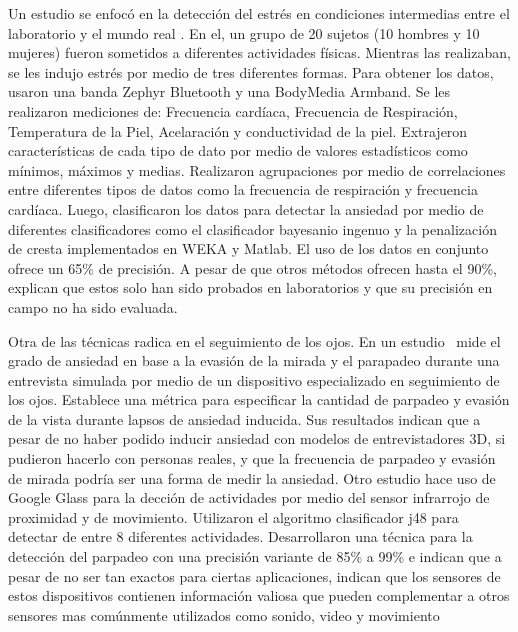 \documentclass[letterpaper,12pt]{cicese}
\begin{document}
				Un estudio se enfoc\'o en la detecci\'on del estr\'es en condiciones intermedias entre el laboratorio y el mundo real \citep{RamosHD14}. En el, un grupo de 20 sujetos (10 hombres y 10 mujeres) fueron sometidos a diferentes actividades f\'isicas. Mientras las realizaban, se les indujo estr\'es por medio de tres diferentes formas. Para obtener los datos, usaron una banda Zephyr Bluetooth y una BodyMedia Armband. Se les realizaron mediciones de: Frecuencia card\'iaca, Frecuencia de Respiraci\'on, Temperatura de la Piel, Acelaraci\'on y conductividad de la piel. Extrajeron caracter\'isticas de cada tipo de dato por medio de valores estad\'isticos como m\'inimos, m\'aximos y medias. Realizaron agrupaciones por medio de correlaciones entre diferentes tipos de datos como la frecuencia de respiraci\'on y frecuencia card\'iaca. Luego, clasificaron los datos para detectar la ansiedad por medio de diferentes clasificadores como el clasificador bayesanio ingenuo y la penalizaci\'on de cresta implementados en WEKA y Matlab. El uso de los datos en conjunto ofrece un 65\% de precisi\'on. A pesar de que otros m\'etodos ofrecen hasta el 90\%, explican que estos solo han sido probados en laboratorios y que su precisi\'on en campo no ha sido evaluada.

				Otra de las t\'ecnicas radica en el seguimiento de los ojos. En un estudio \citep{Kwon2009} mide el grado de ansiedad en base a la evasi\'on de la mirada y el parapadeo durante una entrevista simulada por medio de un dispositivo especializado en seguimiento de los ojos. Establece una m\'etrica para especificar la cantidad de parpadeo y evasi\'on de la vista durante lapsos de ansiedad inducida. Sus resultados indican que a pesar de no haber podido inducir ansiedad con modelos de entrevistadores 3D, si pudieron hacerlo con personas reales, y que la frecuencia de parpadeo y evasi\'on de mirada podr\'ia ser una forma de medir la ansiedad. Otro estudio hace uso de Google Glass para la decci\'on de actividades por medio del sensor infrarrojo de proximidad y de movimiento. Utilizaron el algoritmo clasificador j48 para detectar de entre 8 diferentes actividades. Desarrollaron una t\'ecnica para la detecci\'on del parpadeo con una precisi\'on variante de 85\% a 99\% e indican que a pesar de no ser tan exactos para ciertas aplicaciones, indican que los sensores de estos dispositivos contienen informaci\'on valiosa que pueden complementar a otros sensores mas com\'unmente utilizados como sonido, video y movimiento \citep{Ishimaru2014}
					
\end{document}
